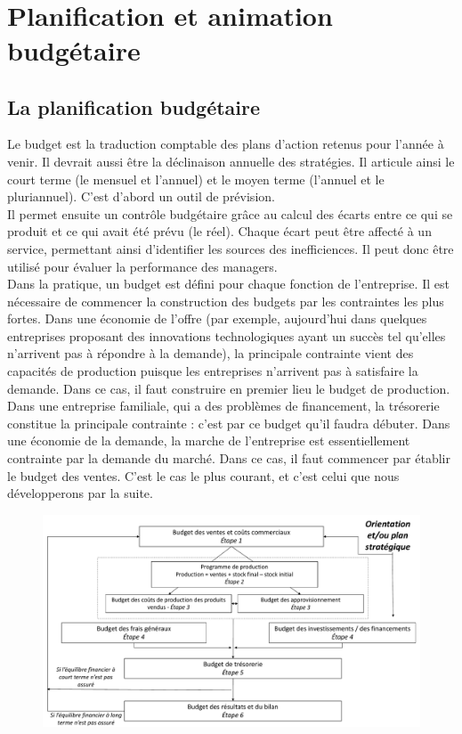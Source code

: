 \documentclass{tufte-handout}
\begin{document}
\clearpage\\
\section{Planification et animation budgétaire}
\label{sec:orgdcf5b09}
\subsection{La planification budgétaire}
\label{sec:org9688ebe}
Le budget est la traduction comptable des plans d'action retenus pour l'année à venir. Il devrait aussi être la déclinaison annuelle des stratégies. Il articule ainsi le court terme (le mensuel et l'annuel) et le moyen terme (l'annuel et le pluriannuel). C'est d'abord un outil de prévision.\\
Il permet ensuite un contrôle budgétaire grâce au calcul des écarts entre ce qui se produit et ce qui avait été prévu (le réel). Chaque écart peut être affecté à un service, permettant ainsi d'identifier les sources des inefficiences. Il peut donc être utilisé pour évaluer la performance des managers.\\

Dans la pratique, un budget est défini pour chaque fonction de l'entreprise. Il est nécessaire de commencer la construction des budgets par les contraintes les plus fortes. Dans une économie de l'offre (par exemple, aujourd'hui dans quelques entreprises proposant des innovations technologiques ayant un succès tel qu'elles n'arrivent pas à répondre à la demande), la principale contrainte vient des capacités de production puisque les entreprises n'arrivent pas à satisfaire la demande. Dans ce cas, il faut construire en premier lieu le budget de production.\\

Dans une entreprise familiale, qui a des problèmes de financement, la trésorerie constitue la principale contrainte : c'est par ce budget qu'il faudra débuter. Dans une économie de la demande, la marche de l'entreprise est essentiellement contrainte par la demande du marché. Dans ce cas, il faut commencer par établir le budget des ventes. C'est le cas le plus courant, et c'est celui que nous développerons par la suite.\\

\begin{figure}[htbp]
\centering
\includegraphics[width=.9\linewidth]{./img/budget.pdf}
\caption{}
\end{figure}
\end{document}
